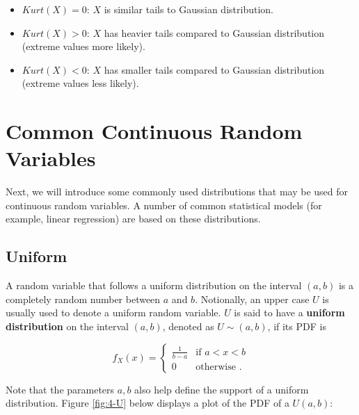 \documentclass[
]{book}
\providecommand{\tightlist}{%
  \setlength{\itemsep}{0pt}\setlength{\parskip}{0pt}}
\begin{document}
\begin{itemize}
\tightlist
\item
  \(Kurt(X) = 0\): \(X\) is similar tails to Gaussian distribution.
\item
  \(Kurt(X) > 0\): \(X\) has heavier tails compared to Gaussian distribution (extreme values more likely).
\item
  \(Kurt(X) < 0\): \(X\) has smaller tails compared to Gaussian distribution (extreme values less likely).
\end{itemize}

\section{Common Continuous Random Variables}\label{common-continuous-random-variables}

Next, we will introduce some commonly used distributions that may be used for continuous random variables. A number of common statistical models (for example, linear regression) are based on these distributions.

\subsection{Uniform}\label{uniform}

A random variable that follows a uniform distribution on the interval \((a,b)\) is a completely random number between \(a\) and \(b\). Notionally, an upper case \(U\) is usually used to denote a uniform random variable. \(U\) is said to have a \textbf{uniform distribution} on the interval \((a,b)\), denoted as \(U \sim(a,b)\), if its PDF is

\begin{equation} 
f_X(x) = \begin{cases} 
  \frac{1}{b-a} & \text{if } a<x<b \\
  0 & \text{otherwise }. 
\end{cases}
\label{eq:4-U}
\end{equation}

Note that the parameters \(a,b\) also help define the support of a uniform distribution. Figure \ref{fig:4-U} below displays a plot of the PDF of a \(U(a,b)\):
\end{document}
